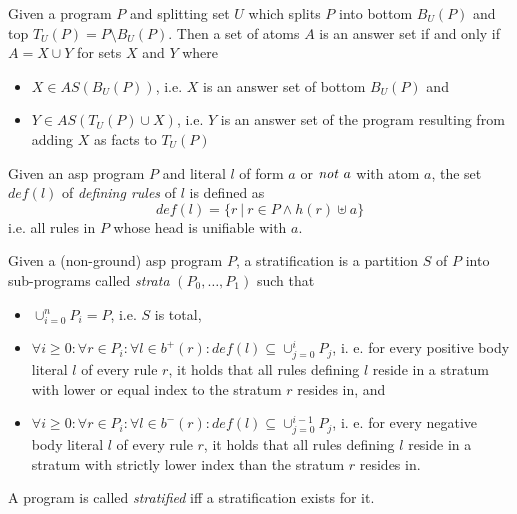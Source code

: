 \begin{theorem}
Given a program $P$ and splitting set $U$ which splits $P$ into bottom $B_U(P)$ and top $T_U(P) = P \setminus B_U(P)$. Then a set of atoms $A$ is an answer set if and only if $A = X \cup Y$ for sets $X$ and $Y$ where
\begin{itemize}
	\item $X \in AS(B_U(P))$, i.e. $X$ is an answer set of bottom $B_U(P)$ and
	\item $Y \in AS(T_U(P) \cup X)$, i.e. $Y$ is an answer set of the program resulting from adding $X$ as facts to $T_U(P)$ 
\end{itemize}	
\end{theorem}	


\begin{definition}
\label{def:prelims-asp-semantics}
Given an \gls{asp} program $P$ and literal $l$ of form $a$ or $\mathit{not}\ a$ with atom $a$, the set $\mathit{def}(l)$ of \emph{defining rules} of $l$ is defined as
\[
	\mathit{def}(l) = \{ r\ |\ r \in P \land h(r) \uplus a \}
\]
i.e. all rules in $P$ whose head is unifiable with $a$.
\end{definition}

\begin{definition}
\label{def:prelims-asp-semantics-stratification}
Given a (non-ground) \gls{asp} program $P$, a stratification is a partition $S$ of $P$ into sub-programs called \emph{strata} $(P_0,\ldots,P_1)$ such that
\begin{itemize}
	\item $\cup^{n}_{i = 0} P_i = P$, i.e. $S$ is total,
	\item $\forall i \geq 0: \forall r \in P_i: \forall l \in b^{+}(r): \mathit{def}(l) \subseteq \cup^{i}_{j = 0} P_j$, i. e. for every positive body literal $l$ of every rule $r$, it holds that all rules defining $l$ reside in a stratum with lower or equal index to the stratum $r$ resides in, and
	\item $\forall i \geq 0: \forall r \in P_i: \forall l \in b^{-}(r): \mathit{def}(l) \subseteq \cup^{i - 1}_{j = 0} P_j$, i. e. for every negative body literal $l$ of every rule $r$, it holds that all rules defining $l$ reside in a stratum with strictly lower index than the stratum $r$ resides in.
\end{itemize}
A program is called \emph{stratified} iff a stratification exists for it.
\end{definition}


